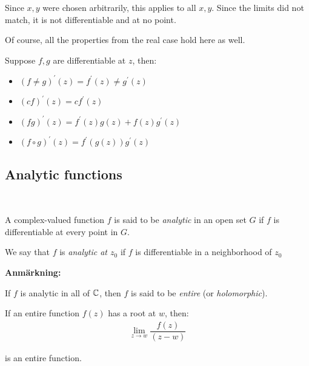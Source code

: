 \noindent Since $x,y$ were chosen arbitrarily, this applies to all $x,y$. Since the limits did not match, it is not differentiable and at no point.
\par\bigskip
\noindent Of course, all the properties from the real case hold here as well.\par
\noindent Suppose $f,g$ are differentiable at $z$, then:\par
\begin{itemize}
  \item $(f\neq g)^{\prime}(z) = f^{\prime}(z)\neq g^{\prime}(z)$
  \item $(cf)^{\prime}(z) = cf^{\prime}(z)$
  \item $(fg)^{\prime}(z) = f^{\prime}(z)g(z)+f(z)g^{\prime}(z)$
  \item $(f\circ g)^{\prime}(z) = f^{\prime}(g(z))g^{\prime}(z)$
\end{itemize}
\newpage
\subsection{Analytic functions}\hfill\\
\par\bigskip
\begin{theo}{}
  A complex-valued function $f$ is said to be \textit{analytic} in an open set $G$ if $f$ is differentiable at every point in $G$.
  \par\bigskip
  \noindent We say that $f$ is \textit{analytic at $z_0$}  if $f$ is differentiable in a neighborhood of $z_0$
\end{theo}
\par\bigskip
\noindent\textbf{Anmärkning:}\par
\noindent If $f$ is analytic in all of $\mathbb{C}$, then $f$ is said to be \textit{entire} (or \textit{holomorphic}).
\par\bigskip
\begin{theo}[]{}
  If an entire function $f(z)$ has a root at $w$, then:
  \begin{equation*}
    \begin{gathered}
      \lim_{z\to w}\dfrac{f(z)}{(z-w)}
    \end{gathered}
  \end{equation*}\par
  \noindent is an entire function. 
\end{theo}

